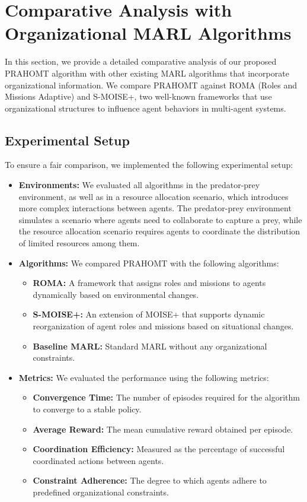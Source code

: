 \documentclass[sigconf,anonymous]{aamas}
\begin{document}
\section{Comparative Analysis with Organizational MARL Algorithms}
\label{sec:comparative-analysis}

In this section, we provide a detailed comparative analysis of our proposed PRAHOMT algorithm with other existing MARL algorithms that incorporate organizational information. We compare PRAHOMT against ROMA (Roles and Missions Adaptive) and S-MOISE+, two well-known frameworks that use organizational structures to influence agent behaviors in multi-agent systems.

\subsection{Experimental Setup}
To ensure a fair comparison, we implemented the following experimental setup:

\begin{itemize}
    \item \textbf{Environments:} We evaluated all algorithms in the predator-prey environment, as well as in a resource allocation scenario, which introduces more complex interactions between agents. The predator-prey environment simulates a scenario where agents need to collaborate to capture a prey, while the resource allocation scenario requires agents to coordinate the distribution of limited resources among them.
    \item \textbf{Algorithms:} We compared PRAHOMT with the following algorithms:
    \begin{itemize}
        \item \textbf{ROMA:} A framework that assigns roles and missions to agents dynamically based on environmental changes.
        \item \textbf{S-MOISE+:} An extension of MOISE+ that supports dynamic reorganization of agent roles and missions based on situational changes.
        \item \textbf{Baseline MARL:} Standard MARL without any organizational constraints.
    \end{itemize}
    \item \textbf{Metrics:} We evaluated the performance using the following metrics:
    \begin{itemize}
        \item \textbf{Convergence Time:} The number of episodes required for the algorithm to converge to a stable policy.
        \item \textbf{Average Reward:} The mean cumulative reward obtained per episode.
        \item \textbf{Coordination Efficiency:} Measured as the percentage of successful coordinated actions between agents.
        \item \textbf{Constraint Adherence:} The degree to which agents adhere to predefined organizational constraints.
    \end{itemize}
\end{itemize}
\end{document}
